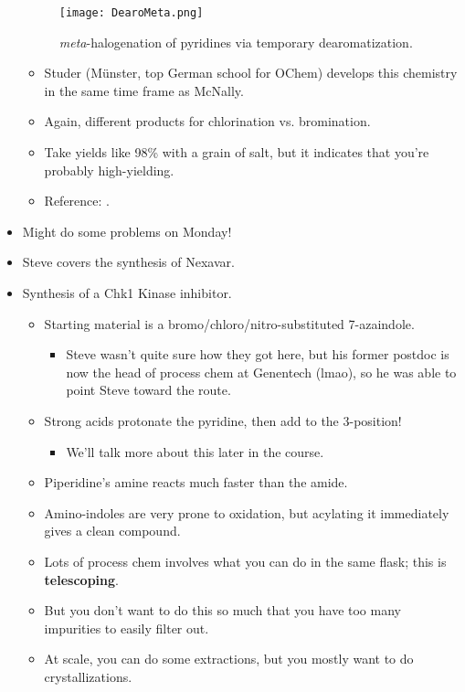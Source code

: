 \documentclass[../notes.tex]{subfiles}
\begin{document}
\begin{itemize}
\begin{figure}[h!]
        \centering
        \texttt{[image: DearoMeta.png]}
        \caption{\emph{meta}-halogenation of pyridines via temporary dearomatization.}
        \label{fig:DearoMeta}
    \end{figure}
    \begin{itemize}
        \item Studer (M\"{u}nster, top German school for OChem) develops this chemistry in the same time frame as McNally.
        \item Again, different products for chlorination vs. bromination.
        \item Take yields like 98\% with a grain of salt, but it indicates that you're probably high-yielding.
        \item Reference: \textcite{bib:DearoMeta}.
    \end{itemize}
    \item Might do some problems on Monday!
    \item Steve covers the synthesis of Nexavar.
    \item Synthesis of a Chk1 Kinase inhibitor.
    \begin{itemize}
        \item Starting material is a bromo/chloro/nitro-substituted 7-azaindole.
        \begin{itemize}
            \item Steve wasn't quite sure how they got here, but his former postdoc is now the head of process chem at Genentech (lmao), so he was able to point Steve toward the route.
        \end{itemize}
        \item Strong acids protonate the pyridine, then add to the 3-position!
        \begin{itemize}
            \item We'll talk more about this later in the course.
        \end{itemize}
        \item Piperidine's amine reacts much faster than the amide.
        \item Amino-indoles are very prone to oxidation, but acylating it immediately gives a clean compound.
        \item Lots of process chem involves what you can do in the same flask; this is \textbf{telescoping}.
        \item But you don't want to do this so much that you have too many impurities to easily filter out.
        \item At scale, you can do some extractions, but you mostly want to do crystallizations.

\end{itemize}
\end{itemize}
\end{document}
